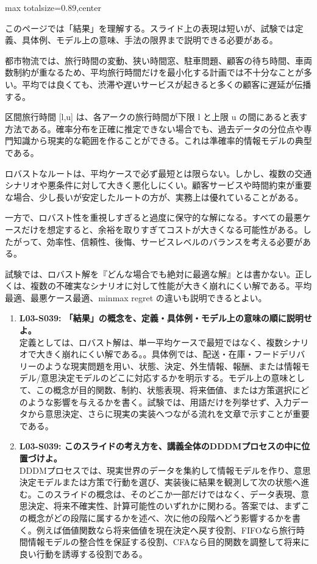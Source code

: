 \begin{minipage}[t]{0.58\textwidth}
\begin{adjustbox}{max totalsize={\textwidth}{0.89\textheight},center}
\begin{minipage}{\textwidth}\scriptsize
{}このページでは「結果」を理解する。スライド上の表現は短いが、試験では定義、具体例、モデル上の意味、手法の限界まで説明できる必要がある。\par
都市物流では、旅行時間の変動、狭い時間窓、駐車問題、顧客の待ち時間、車両数制約が重なるため、平均旅行時間だけを最小化する計画では不十分なことが多い。平均では良くても、渋滞や遅いサービスが起きると多くの顧客に遅延が伝播する。\par
区間旅行時間 [l,u] は、各アークの旅行時間が下限 l と上限 u の間にあると表す方法である。確率分布を正確に推定できない場合でも、過去データの分位点や専門知識から現実的な範囲を作ることができる。これは準確率的情報モデルの典型である。\par
ロバストなルートは、平均ケースで必ず最短とは限らない。しかし、複数の交通シナリオや悪条件に対して大きく悪化しにくい。顧客サービスや時間約束が重要な場合、少し長いが安定したルートの方が、実務上は優れていることがある。\par
一方で、ロバスト性を重視しすぎると過度に保守的な解になる。すべての最悪ケースだけを想定すると、余裕を取りすぎてコストが大きくなる可能性がある。したがって、効率性、信頼性、後悔、サービスレベルのバランスを考える必要がある。\par
試験では、ロバスト解を『どんな場合でも絶対に最適な解』とは書かない。正しくは、複数の不確実なシナリオに対して性能が大きく崩れにくい解である。平均最適、最悪ケース最適、minmax regret の違いも説明できるとよい。\par{}\begin{enumerate}\item \textbf{L03-S039: 「結果」の概念を、定義・具体例・モデル上の意味の順に説明せよ。}\\定義としては、ロバスト解は、単一平均ケースで最短ではなく、複数シナリオで大きく崩れにくい解である。。具体例では、配送・在庫・フードデリバリーのような現実問題を用い、状態、決定、外生情報、報酬、または情報モデル/意思決定モデルのどこに対応するかを明示する。モデル上の意味として、この概念が目的関数、制約、状態表現、将来価値、または方策選択にどのような影響を与えるかを書く。試験では、用語だけを列挙せず、入力データから意思決定、さらに現実の実装へつながる流れを文章で示すことが重要である。\item \textbf{L03-S039: このスライドの考え方を、講義全体のDDDMプロセスの中に位置づけよ。}\\DDDMプロセスでは、現実世界のデータを集約して情報モデルを作り、意思決定モデルまたは方策で行動を選び、実装後に結果を観測して次の状態へ進む。このスライドの概念は、そのどこか一部だけではなく、データ表現、意思決定、将来不確実性、計算可能性のいずれかに関わる。答案では、まずこの概念がどの段階に属するかを述べ、次に他の段階へどう影響するかを書く。例えば価値関数なら将来価値を現在決定へ戻す役割、FIFOなら旅行時間情報モデルの整合性を保証する役割、CFAなら目的関数を調整して将来に良い行動を誘導する役割である。\end{enumerate}

\end{minipage}
\end{adjustbox}
\end{minipage}
